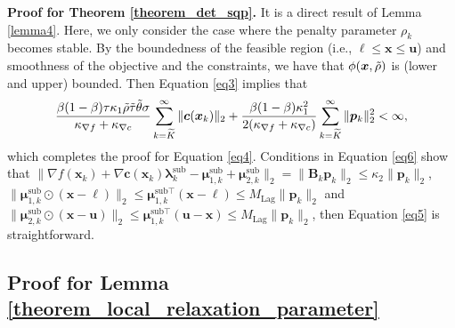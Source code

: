\documentclass[aos]{imsart}
\numberwithin{equation}{section}
\theoremstyle{plain}
\begin{document}
\begin{appendix}
\textbf{Proof for Theorem \ref{theorem_det_sqp}.}
     It is a direct result of Lemma \ref{lemma4}. Here, we only consider the case where the penalty parameter $\rho_k$ becomes stable. By the boundedness of the feasible region (i.e., $\bm{\ell} \leq \bm{x} \leq \bm{u}$) and smoothness of the objective and the constraints, we have that $\phi(\bm{x},\Tilde{\rho})$ is (lower and upper) bounded. Then Equation \eqref{eq3} implies that
     \begin{equation*}
          \frac{\beta (1-\beta) \tau\kappa_1 \Tilde{\rho} \Tilde{\tau} \Tilde{\theta} \sigma}{\kappa_{\nabla f}+\kappa_{\nabla c}} \sum_{k=\widetilde{K}}^{\infty} \|\bm{c}(\bm{x}_k)\|_2 + \frac{\beta (1-\beta)\kappa_1^2}{2(\kappa_{\nabla f}+\kappa_{\nabla c})} \sum_{k=\widetilde{K}}^{\infty} \|\bm{p}_k\|_2^2 < \infty,
     \end{equation*}
     which completes the proof for Equation \eqref{eq4}. Conditions in Equation \eqref{eq6} show that $\| \nabla f(\bm{x}_k) +  \nabla \bm{c}(\bm{x}_k) \bm{\lambda}_k^{\text{sub}} - \bm{\mu}_{1,k}^{\text{sub}} + \bm{\mu}_{2,k}^{\text{sub}} \|_2 = \|\bm{B}_k\bm{p}_k\|_2 \leq \kappa_2 \|\bm{p}_k\|_2$, $\|\bm{\mu}_{1,k}^{\text{sub}} \odot (\bm{x}-\bm{\ell})\|_2 \leq \bm{\mu}_{1,k}^{\text{sub} \top}(\bm{x}-\bm{\ell}) \leq M_{\text{Lag}}\|\bm{p}_k\|_2$ and $\|\bm{\mu}_{2,k}^{\text{sub}} \odot (\bm{x}-\bm{u})\|_2 \leq \bm{\mu}_{1,k}^{\text{sub} \top}(\bm{u}-\bm{x}) \leq M_{\text{Lag}}\|\bm{p}_k\|_2$, then Equation \eqref{eq5} is straightforward.

\subsection{Proof for Lemma \ref{theorem_local_relaxation_parameter}}
\label{sec:appendix1.4}


\end{appendix}
\end{document}
